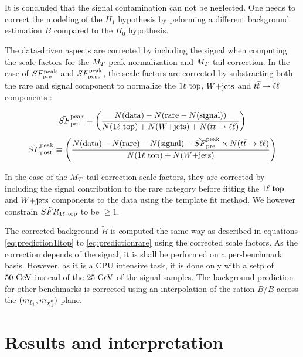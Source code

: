         It is concluded that the signal contamination can not be neglected. One needs to correct the modeling
        of the $H_1$ hypothesis by peforming a different background estimation $\tilde{B}$ compared to the 
        $H_0$ hypothesis.

        The data-driven aspects are corrected by including the signal when computing the scale factors for the
        $M_T$-peak normalization and $M_T$-tail correction. In the case of $SF_{\text{pre}}^{\text{peak}}$ and $SF_{\text{post}}^{\text{peak}}$, the scale factors
        are corrected by substracting both the rare and signal component to normalize the $1\ell~\text{top}$, $\text{$W$+jets}$
        and $t\bar{t} \rightarrow \ell \ell$ components :

        \begin{equation}
            \tilde{SF}_{\text{pre}}^{\text{peak}} \equiv \left( \frac{N(\text{data}) - N(\text{rare} - N(\text{signal}))}{N(1\ell~\text{top}) + N(\text{$W$+jets}) + N(t\bar{t} \rightarrow \ell \ell)} \right)
        \end{equation}
        \begin{equation}
            \tilde{SF}_{\text{post}}^{\text{peak}} \equiv \left( \frac{N(\text{data}) - N(\text{rare}) - N(\text{signal}) - \tilde{SF}_{\text{pre}}^{\text{peak}} \times N(t\bar{t} \rightarrow \ell \ell)}{N(1\ell~\text{top}) + N(\text{$W$+jets})} \right)
        \end{equation}

        In the case of the $M_T$-tail correction scale factors, they are corrected by including the signal contribution
        to the rare category before fitting the $1\ell~\text{top}$ and $\text{$W$+jets}$ components to the data using the template
        fit method. We however constrain $\tilde{SFR}_{1\ell~\text{top}}$ to be $\geq 1$.

        The corrected background $\tilde{B}$ is computed the same way as described in equations \ref{eq:prediction1ltop} to \ref{eq:predictionrare}
        using the corrected scale factors. As the correction depends of the signal, it is shall be performed on a per-benchmark
        basis. However, as it is a CPU intensive task, it is done only with a setp of $50 ~\text{GeV}$ instead of the $25 ~\text{GeV}$
        of the signal samples. The background prediction for other benchmarks is corrected using an interpolation of
        the ration $\tilde{B}/B$ across the $(m_{\tilde{t}_1},m_{\tilde{\chi}_1^0})$ plane.

    \section{Results and interpretation \label{sec:analysis_results}}
        \loremipsum

